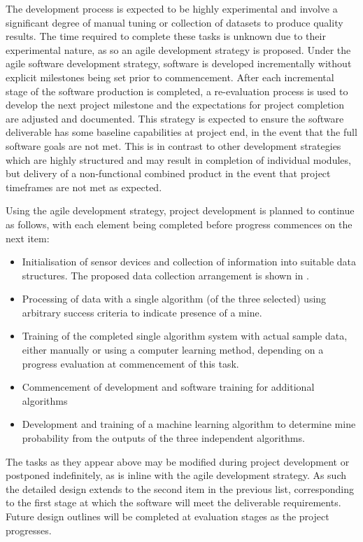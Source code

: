\documentclass[main.tex]{subfiles}
\begin{document}
The development process is expected to be highly experimental and involve a significant degree of manual tuning or collection of datasets to produce quality results. The time required to complete these tasks is unknown due to their experimental nature, as so an agile development strategy is proposed. Under the agile software development strategy, software is developed incrementally without explicit milestones being set prior to commencement. After each incremental stage of the software production is completed, a re-evaluation process is used to develop the next project milestone and the expectations for project completion are adjusted and documented. This strategy is expected to ensure the software deliverable has some baseline capabilities at project end, in the event that the full software goals are not met. This is in contrast to other development strategies which are highly structured and may result in completion of individual modules, but delivery of a non-functional combined product in the event that project timeframes are not met as expected.

Using the agile development strategy, project development is planned to continue as follows, with each element being completed before progress commences on the next item:
\begin{itemize}
\item Initialisation of sensor devices and collection of information into suitable data structures. The proposed data collection arrangement is shown in .
\item Processing of data with a single algorithm (of the three selected) using arbitrary success criteria to indicate presence of a mine.
\item Training of the completed single algorithm system with actual sample data, either manually or using a computer learning method, depending on a progress evaluation at commencement of this task.
\item Commencement of development and software training for additional algorithms
\item Development and training of a machine learning algorithm to determine mine probability from the outputs of the three independent algorithms.
\end{itemize}

The tasks as they appear above may be modified during project development or postponed indefinitely, as is inline with the agile development strategy. As such the detailed design extends to the second item in the previous list, corresponding to the first stage at which the software will meet the deliverable requirements. Future design outlines will be completed at evaluation stages as the project progresses.
\end{document}
